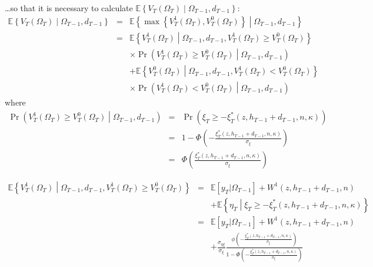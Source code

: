 \noindent \ldots so that it is necessary to calculate $\mathbb{E} \left\{ V_T\left(\Omega_T\right) \middle| \Omega_{T-1}, d_{T-1}\right\}$:
\begin{eqnarray}
\mathbb{E} \left\{ V_T\left(\Omega_T\right) \middle| \Omega_{T-1}, d_{T-1}\right\} &=& \mathbb{E} \left\{ \max\left\{ V^{1}_T\left(\Omega_T\right), V^{0}_T\left(\Omega_T\right) \right\} \middle| \Omega_{T-1}, d_{T-1} \right\} \nonumber \\
&=& \mathbb{E} \left\{ V^{1}_T\left(\Omega_T\right) \middle| \Omega_{T-1}, d_{T-1}, V^{1}_T\left(\Omega_T\right) \geq V^{0}_T\left(\Omega_T\right) \right\} \nonumber \\
& & \times \Pr\left(V^1_T\left(\Omega_T\right) \geq V^0_T\left(\Omega_T\right) \middle| \Omega_{T-1}, d_{T-1} \right) \nonumber \\
& & + \mathbb{E} \left\{ V^{0}_T\left(\Omega_T\right) \middle| \Omega_{T-1}, d_{T-1}, V^{1}_T\left(\Omega_T\right) < V^{0}_T\left(\Omega_T\right) \right\} \nonumber \\
& & \times \Pr\left(V^1_T\left(\Omega_T\right) < V^0_T\left(\Omega_T\right) \middle| \Omega_{T-1}, d_{T-1} \right)
\end{eqnarray}
\noindent where
\begin{eqnarray}
\Pr\left(V^1_T\left(\Omega_T\right) \geq V^0_T\left(\Omega_T\right) \middle| \Omega_{T-1}, d_{T-1} \right) &=& \Pr\left(\xi_T \geq - \xi^*_T\left(z, h_{T-1}+d_{T-1},n,\kappa\right)\right) \nonumber \\
&=& 1 - \Phi\left( -\frac{\xi^*_T\left(z,h_{T-1}+d_{T-1},n,\kappa\right)}{\sigma_\xi}\right) \nonumber \\
&=& \Phi\left( \frac{\xi^*_T\left(z,h_{T-1}+d_{T-1},n,\kappa\right)}{\sigma_\xi}\right)
\end{eqnarray}

\begin{eqnarray}
\mathbb{E} \left\{ V^{1}_T\left(\Omega_T\right) \middle| \Omega_{T-1}, d_{T-1}, V^{1}_T\left(\Omega_T\right) \geq V^{0}_T\left(\Omega_T\right) \right\} &=& \mathbb{E} [y_T | \Omega_{T-1}] + W^1\left( z,h_{T-1}+d_{T-1},n\right) \nonumber \\
& & +\mathbb{E} \left\{\eta_T \middle| \xi_T \geq - \xi^*_T\left( z, h_{T-1}+d_{T-1}, n, \kappa \right)\right\} \nonumber \\
&=& \mathbb{E} [y_T | \Omega_{T-1}] + W^1\left( z,h_{T-1}+d_{T-1},n \right) \nonumber \\
& & +  \frac{\sigma_{\eta \xi}}{\sigma_\xi} \frac{\phi\left(-\frac{\xi^*_T\left(z,h_{T-1}+d_{T-1},n,\kappa\right)}{\sigma_\xi}\right)}{1-\Phi\left(-\frac{\xi^*_T\left(z,h_{T-1}+d_{T-1},n,\kappa\right)}{\sigma_\xi}\right)}
\end{eqnarray}

